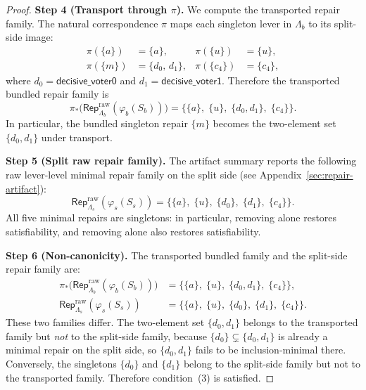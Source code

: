 \begin{proof}
\medskip
\noindent\textbf{Step 4 (Transport through $\pi$).}
We compute the transported repair family.
The natural correspondence $\pi$ maps each singleton lever in $\Lambda_b$ to its split-side image:
\begin{align*}
  \pi(\{a\})   &= \{a\},  &
  \pi(\{u\})   &= \{u\},  \\
  \pi(\{m\})   &= \{d_0,\, d_1\},  &
  \pi(\{c_4\}) &= \{c_4\},
\end{align*}
where $d_0 = \mathsf{decisive\_voter0}$ and $d_1 = \mathsf{decisive\_voter1}$.
Therefore the transported bundled repair family is
\[
  \pi_*\!\bigl(\mathsf{Rep}^{\mathrm{raw}}_{\Lambda_b}(\varphi_b(S_b))\bigr)
  = \bigl\{\{a\},\;\{u\},\;\{d_0,d_1\},\;\{c_4\}\bigr\}.
\]
In particular, the bundled singleton repair $\{m\}$ becomes the two-element set $\{d_0,d_1\}$ under transport.

\medskip
\noindent\textbf{Step 5 (Split raw repair family).}
The artifact summary reports the following raw lever-level minimal repair family on the split side (see Appendix~\ref{sec:repair-artifact}):
\[
  \mathsf{Rep}^{\mathrm{raw}}_{\Lambda_s}(\varphi_s(S_s))
  = \bigl\{\{a\},\;\{u\},\;\{d_0\},\;\{d_1\},\;\{c_4\}\bigr\}.
\]
All five minimal repairs are singletons: in particular, removing  alone restores satisfiability, and removing  alone also restores satisfiability.

\medskip
\noindent\textbf{Step 6 (Non-canonicity).}
The transported bundled family and the split-side repair family are:
\begin{align*}
  \pi_*\!\bigl(\mathsf{Rep}^{\mathrm{raw}}_{\Lambda_b}(\varphi_b(S_b))\bigr)
  &= \bigl\{\{a\},\;\{u\},\;\{d_0,d_1\},\;\{c_4\}\bigr\}, \\[4pt]
  \mathsf{Rep}^{\mathrm{raw}}_{\Lambda_s}(\varphi_s(S_s))
  &= \bigl\{\{a\},\;\{u\},\;\{d_0\},\;\{d_1\},\;\{c_4\}\bigr\}.
\end{align*}
These two families differ.
The two-element set $\{d_0,d_1\}$ belongs to the transported family but \emph{not} to the split-side family, because $\{d_0\} \subsetneq \{d_0,d_1\}$ is already a minimal repair on the split side, so $\{d_0,d_1\}$ fails to be inclusion-minimal there.
Conversely, the singletons $\{d_0\}$ and $\{d_1\}$ belong to the split-side family but not to the transported family.
Therefore condition~(3) is satisfied.
\end{proof}

